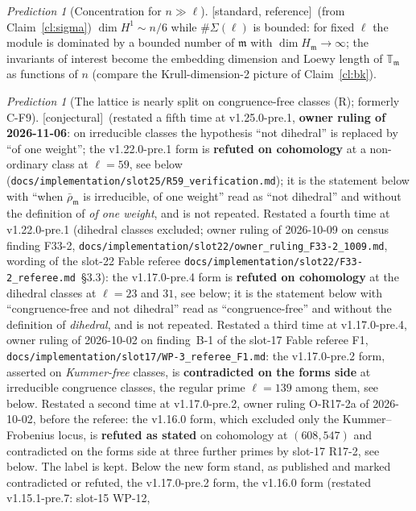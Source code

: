 \documentclass[11pt]{article}
\theoremstyle{remark}
\newtheorem{prediction}[theorem]{Prediction}
\newcommand{\T}{\mathbb{T}}
\newcommand{\m}{\mathfrak{m}}
\newcommand{\STD}{\textsf{[standard, reference]}}
\newcommand{\CONJ}{\textsf{[conjectural]}}
\begin{document}
\begin{prediction}[Concentration for $n\gg\ell$]\label{pr:conc}\STD\ (from Claim~\ref{cl:sigma})
$\dim H^1\sim n/6$ while $\#\Sigma(\ell)$ is bounded: for fixed $\ell$ the module is
dominated by a bounded number of $\m$ with $\dim H_\m\to\infty$; the invariants of interest
become the embedding dimension and Loewy length of $\T_\m$ as functions of $n$ (compare the
Krull-dimension-2 picture of Claim~\ref{cl:bk}).
\end{prediction}

\begin{prediction}[The lattice is nearly split on congruence-free classes (R); formerly C-F9]\label{pr:latticesplit}\CONJ\
(restated a fifth time at v1.25.0-pre.1, \textbf{owner ruling of 2026-11-06}: on irreducible classes the hypothesis ``not dihedral'' is replaced by
``of one weight''; the v1.22.0-pre.1 form is \textbf{refuted on cohomology} at a non-ordinary class at $\ell=59$, see below
(\texttt{docs/implementation/slot25/R59\_verification.md}); it is the statement below with ``when $\bar\rho_\m$ is irreducible, of one weight'' read as
``not dihedral'' and without the definition of \emph{of one weight}, and is not repeated.
Restated a fourth time at v1.22.0-pre.1 (dihedral classes excluded; owner ruling of 2026-10-09 on census finding F33-2,
\texttt{docs/implementation/slot22/owner\_ruling\_F33-2\_1009.md}, wording of the slot-22 Fable referee \texttt{docs/implementation/slot22/F33-2\_referee.md}~\S3.3):
the v1.17.0-pre.4 form is \textbf{refuted on cohomology} at the dihedral classes at $\ell=23$ and $31$, see below; it is the statement below with
``congruence-free and not dihedral'' read as ``congruence-free'' and without the definition of \emph{dihedral}, and is not repeated.
Restated a third time at v1.17.0-pre.4, owner ruling of 2026-10-02 on finding~B-1 of the slot-17 Fable referee F1,
\texttt{docs/implementation/slot17/WP-3\_referee\_F1.md}: the v1.17.0-pre.2 form, asserted on \emph{Kummer-free} classes, is \textbf{contradicted on the
forms side} at irreducible congruence classes, the regular prime $\ell=139$ among them, see below. Restated a second time at v1.17.0-pre.2, owner ruling
O-R17-2a of 2026-10-02, before the referee: the v1.16.0 form, which excluded only the Kummer--Frobenius locus, is \textbf{refuted as stated} on cohomology at
$(608,547)$ and contradicted on the forms side at three further primes by slot-17 R17-2, see below. The label is kept. Below the new form stand, as published
and marked contradicted or refuted, the v1.17.0-pre.2 form, the v1.16.0 form (restated v1.15.1-pre.7: slot-15 WP-12,

\end{prediction}
\end{document}
